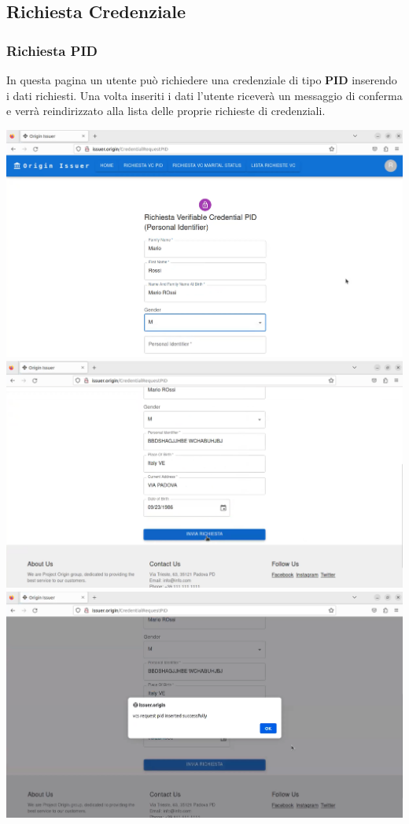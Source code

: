 \subsection{Richiesta Credenziale}
\subsubsection{Richiesta PID}
In questa pagina un utente può richiedere una credenziale di tipo \textbf{PID} inserendo i dati richiesti. Una volta inseriti i dati l'utente riceverà un messaggio di conferma e verrà reindirizzato alla lista delle proprie richieste di credenziali.
\begin{center}
\includegraphics[scale = 0.2]{./res/img/issuer/new/richiestapid1.png}
\includegraphics[scale = 0.2]{./res/img/issuer/new/richiestapid2.png}
\includegraphics[scale = 0.2]{./res/img/issuer/new/richiestapid3.png}
\end{center}

